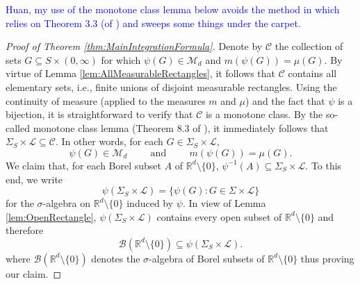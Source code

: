 \documentclass[11pt]{article}
\theoremstyle{theorem}
\begin{document}
\noindent\textcolor{blue}{Huan, my use of the monotone class lemma below avoids the method in \cite{Stein2005} which relies on Theorem 3.3 (of \cite{Stein2005}) and sweeps some things under the carpet.}

\begin{proof}[Proof of Theorem \ref{thm:MainIntegrationFormula}]
Denote by $\mathcal{C}$ the collection of sets $G\subseteq S\times (0,\infty)$ for which $\psi(G)\in \mathcal{M}_d$ and $m(\psi(G))=\mu(G).$ By virtue of Lemma \ref{lem:AllMeasurableRectangles}, it follows that $\mathcal{C}$ contains all elementary sets, i.e., finite unions of disjoint measurable rectangles. Using the continuity of measure (applied to the measures $m$ and $\mu$) and the fact that $\psi$ is a bijection, it is straightforward to verify that $\mathcal{C}$ is a monotone class. By the so-called monotone class lemma (Theorem 8.3 of \cite{Rudin1987}), it immediately follows that $\Sigma_S\times\mathcal{L}\subseteq\mathcal{C}$. In other words, for each $G\in\Sigma_S\times\mathcal{L}$,
\begin{equation}\label{eq:Good1}
\psi(G)\in\mathcal{M}_d\hspace{1cm}\mbox{and}\hspace{1cm}m(\psi(G))=\mu(G).
\end{equation}
We claim that, for each Borel subset $A$ of $\mathbb{R}^d\setminus\{0\}$, $\psi^{-1}(A)\subseteq \Sigma_S\times \mathcal{L}$. To this end, we write
\begin{equation*}
\psi(\Sigma_S\times\mathcal{L})=\{\psi(G):G\in\Sigma\times \mathcal{L}\}
\end{equation*}
for the $\sigma$-algebra on $\mathbb{R}^d\setminus\{0\}$ induced by $\psi$. In view of Lemma \ref{lem:OpenRectangle}, $\psi(\Sigma_S\times\mathcal{L})$ contains every open subset of $\mathbb{R}^d\setminus\{0\}$ and therefore
\begin{equation*}
\mathcal{B}(\mathbb{R}^d\setminus\{0\})\subseteq\psi(\Sigma_S\times\mathcal{L}).
\end{equation*}
where $\mathcal{B}(\mathbb{R}^d\setminus\{0\})$ denotes the $\sigma$-algebra of Borel subsets of $\mathbb{R}^d\setminus\{0\}$ thus proving our claim. 


\end{proof}
\end{document}
